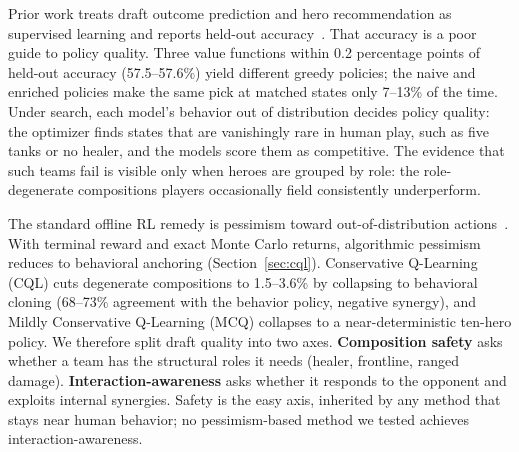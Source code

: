 \documentclass[journal]{IEEEtran}
\begin{document}
Prior work treats draft outcome prediction and hero recommendation as supervised learning and reports held-out accuracy~\cite{chen2018drafting,gourdeau2021discriminative,summerville2016draft,lee2022draftrec}. That accuracy is a poor guide to policy quality. Three value functions within 0.2 percentage points of held-out accuracy (57.5--57.6\%) yield different greedy policies; the naive and enriched policies make the same pick at matched states only 7--13\% of the time. Under search, each model's behavior out of distribution decides policy quality: the optimizer finds states that are vanishingly rare in human play, such as five tanks or no healer, and the models score them as competitive. The evidence that such teams fail is visible only when heroes are grouped by role: the role-degenerate compositions players occasionally field consistently underperform.

The standard offline RL remedy is pessimism toward out-of-distribution actions~\cite{kumar2020conservative,lyu2022mildly}. With terminal reward and exact Monte Carlo returns, algorithmic pessimism reduces to behavioral anchoring (Section~\ref{sec:cql}). Conservative Q-Learning (CQL) cuts degenerate compositions to 1.5--3.6\% by collapsing to behavioral cloning (68--73\% agreement with the behavior policy, negative synergy), and Mildly Conservative Q-Learning (MCQ) collapses to a near-deterministic ten-hero policy. We therefore split draft quality into two axes. \textbf{Composition safety} asks whether a team has the structural roles it needs (healer, frontline, ranged damage). \textbf{Interaction-awareness} asks whether it responds to the opponent and exploits internal synergies. Safety is the easy axis, inherited by any method that stays near human behavior; no pessimism-based method we tested achieves interaction-awareness.
\end{document}
